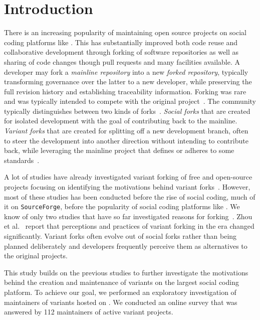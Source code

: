 \section{Introduction}
\label{sec:intro}
There is an increasing popularity of maintaining open source projects on social coding platforms like \gh. This has substantially improved both code reuse and collaborative development through forking of software repositories as well as sharing of code changes though pull requests and many \git facilities available.
A developer may fork a \textit{mainline repository} into a new \textit{forked repository}, typically transforming governance over the latter to a new developer, while preserving the full revision history and establishing traceability information. 
Forking was rare and was typically intended to compete with the original project~\cite{Linus:2012Perspectives,Gregorio:2012,Viseur:2012Forks,Linus:2013CodeForking,Linus:2011ToFork,Gamalielsson:2014Sustainability}.
The community typically distinguishes between two kinds of forks~\cite{Zhou:2020}.
\textit{Social forks} that are created for isolated development with the goal of contributing back to the mainline. \textit{Variant forks} that are created for splitting off a new development branch, often to steer the development into another direction without intending to contribute back, while leveraging the mainline project that defines or adheres to some standards~\cite{sung:ICSE:2020}.

A lot of studies have already investigated variant forking of free and open-source projects focusing on identifying the motivations behind variant forks~\cite{Linus:2012Perspectives,Gregorio:2012,Viseur:2012Forks,Linus:2013CodeForking,Linus:2011ToFork,Gamalielsson:2014Sustainability}. However, most of these studies has been conducted before the rise of social coding, much of it on \texttt{SourceForge}, before the popularity of social coding platforms like \gh. 
We know of only two studies that have so far investigated reasons for forking~\cite{businge:2018icsme,Zhou:2020}. Zhou et al.~\cite{Zhou:2020} report that perceptions and practices of variant forking in the \gh era changed significantly. Variant forks often evolve out of social forks rather than being planned deliberately and developers frequently perceive them as alternatives to the original projects.

This study builds on the previous studies to further investigate the motivations behind the creation and maintenance of variants on \gh the largest social coding platform. To achieve our goal, we performed an exploratory investigation of maintainers of variants hosted on \gh. We conducted an online survey that was answered by 112 maintainers of active variant projects.

